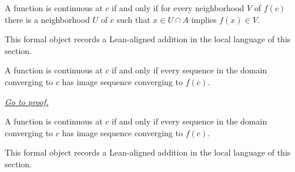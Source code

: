 \begin{remark*}
A function is continuous at $c$ if and only if for every neighborhood $V$ of $f(c)$ there is a neighborhood $U$ of $c$ such that $x\in U\cap A$ implies $f(x)\in V$.
\end{remark*}

\begin{remark*}[Interpretation]
This formal object records a Lean-aligned addition in the local language of this section.
\end{remark*}

\begin{dependencies}
\NoLocalDependencies
\end{dependencies}
\begin{theorem}
\label{thm:continuous-at-point-iff-seq}
A function is continuous at $c$ if and only if every sequence in the domain converging to $c$ has image sequence converging to $f(c)$.

\smallskip
\noindent
\hyperref[prf:continuous-at-point-iff-seq]{\textit{Go to proof.}}
\end{theorem}

\begin{remark*}
A function is continuous at $c$ if and only if every sequence in the domain converging to $c$ has image sequence converging to $f(c)$.
\end{remark*}

\begin{remark*}[Interpretation]
This formal object records a Lean-aligned addition in the local language of this section.
\end{remark*}

\begin{dependencies}
\NoLocalDependencies
\end{dependencies}
